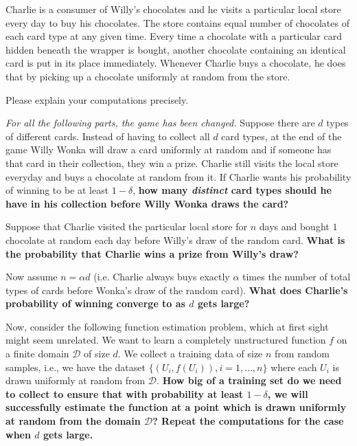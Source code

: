 \documentclass[preview]{standalone}
\begin{document}
Charlie is a consumer of Willy's chocolates and he visits a particular
local store every day to buy his chocolates.
The store contains equal number of chocolates of each card type at any given time.
Every time a chocolate with a particular card hidden beneath the wrapper is bought, 
another chocolate containing an identical card is put in its place immediately.
Whenever Charlie buys a chocolate, he does that by picking up a chocolate uniformly at random from the store.

\begin{Parts}

 Please explain your computations precisely.



\Part \emph{For all the following parts, the game has been changed.} 
Suppose there are $d$ types of different cards.
Instead of having to collect all $d$ card types, at the end of the game Willy 
Wonka will draw a card uniformly at random and if someone has that card in their collection,
they win a prize. Charlie still visits the local store everyday and buys a chocolate at random from it.
If Charlie wants his probability of winning to
be at least $1-\delta$, {\bf how many \emph{distinct} card types should he have in his
collection before Willy Wonka draws the card?}



\Part Suppose that Charlie visited the particular local store for $n$ days and bought
$1$ chocolate at random each day before Willy's draw of the random card.
{\bf What is the probability that Charlie wins a prize from Willy's draw?}



\Part 
Now assume $n = \alpha d$ (i.e. Charlie always buys exactly $\alpha$
times the number of total types of cards before Wonka's draw of the random
card).  {\bf What does Charlie's probability of winning converge to as
  $d$ gets large?  }



\Part Now, consider the following function estimation problem, which 
at first sight might seem unrelated. 
We want to learn a completely unstructured function $f$ on
a finite domain $\mathcal{D}$ of size $d$. We collect a 
training data of size $n$ from random samples,
i.e., we have the dataset $\{(U_i, f(U_i)), i=1, \ldots, n \}$ where
each $U_i$ is drawn uniformly at random from $\mathcal{D}$.
{\bf How big of a training set do we need to collect to ensure that 
with probability at least $1-\delta$, we will successfully
estimate the function at a point which is drawn uniformly at random from the domain $\mathcal{D}$?
Repeat the computations for the case when $d$ gets large.
}



\end{Parts}
\end{document}
